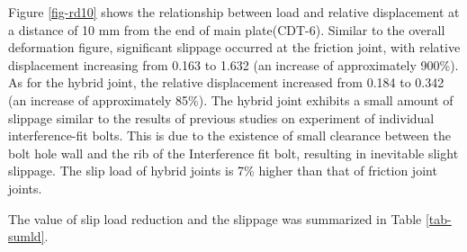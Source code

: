 Figure \ref{fig-rd10} shows the relationship between load and relative displacement at a distance of 10 mm from the end of main plate(CDT-6). Similar to the overall deformation figure, significant slippage occurred at the friction joint, with relative displacement increasing from 0.163 to 1.632 (an increase of approximately 900\%). As for the hybrid joint, the relative displacement increased from 0.184 to 0.342 (an increase of approximately 85\%). The hybrid joint exhibits a small amount of slippage similar to the results of previous studies\cite{kamei2010} on experiment of individual interference-fit bolts. This is due to the existence of small clearance between the bolt hole wall and the rib of the Interference fit bolt, resulting in inevitable slight slippage. The slip load of hybrid joints is 7\% higher than that of friction joint joints.

The value of slip load reduction and the slippage was summarized in Table \ref{tab-sumld}.

